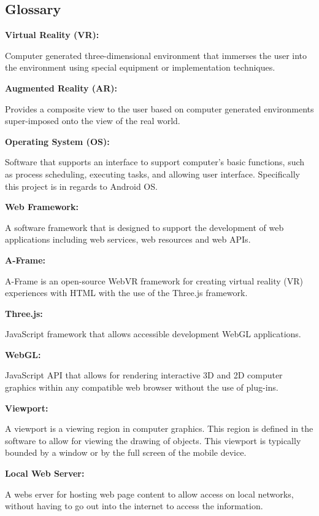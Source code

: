 \documentclass[letterpaper,10pt,draftclsnofoot,onecolumn,compsoc]{IEEEtran}
\begin{document}
\subsection{Glossary}
\begin{singlespace}
\begin{enumerate}[labelsep=2em,leftmargin=.5in]
    {\item \bfseries Virtual Reality (VR): } Computer generated three-dimensional environment that immerses the user into the environment using special equipment or implementation techniques. \vspace{.1cm}
    {\item \bfseries Augmented Reality (AR): } Provides a composite view to the user based on computer generated environments super-imposed onto the view of the real world. \vspace{.1cm}
    {\item \bfseries Operating System (OS): } Software that supports an interface to support computer's basic functions, such as process scheduling, executing tasks, and allowing user interface. Specifically this project is in regards to Android OS. \vspace{.1cm}
    {\item \bfseries Web Framework: } A software framework that is designed to support the development of web applications including web services, web resources and web APIs. \vspace{.1cm}
    {\item \bfseries A-Frame: } A-Frame is an open-source WebVR framework for creating virtual reality (VR) experiences with HTML with the use of the Three.js framework.\vspace{.1cm}
    {\item \bfseries Three.js: } JavaScript framework that allows accessible development WebGL applications. \vspace{.1cm}
    {\item \bfseries WebGL: } JavaScript API that allows for rendering interactive 3D and 2D computer graphics within any compatible web browser without the use of plug-ins. \vspace{.1cm}
    {\item \bfseries Viewport: } A viewport is a viewing region in computer graphics. This region is defined in the software to allow for viewing the drawing of objects. This viewport is typically bounded by a window or by the full screen of the mobile device. \vspace{.1cm}
    {\item \bfseries Local Web Server: } A webs erver for hosting web page content to allow access on local networks, without having to go out into the internet to access the information. \vspace{.1cm}

\end{enumerate}
\end{singlespace}
\end{document}
